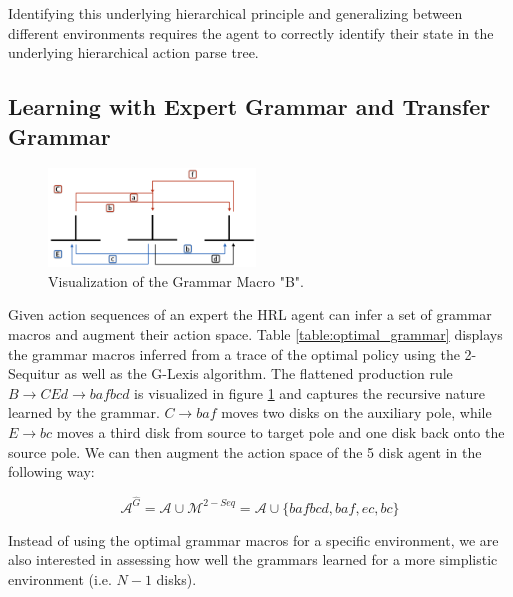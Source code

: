 \documentclass[colorinlistoftodos]{article}
\theoremstyle{definition}
\begin{document}
Identifying this underlying hierarchical principle and generalizing between different environments requires the agent to correctly identify their state in the underlying hierarchical action parse tree.
\subsection{Learning with Expert Grammar and Transfer Grammar}


\begin{figure}
  \begin{center}
    \includegraphics[width=0.49\textwidth]{figures/grammar_macro_viz}
  \end{center}
  \caption{Visualization of the Grammar Macro "B".}
  \label{fig:grammar_macro}
\end{figure}

Given action sequences of an expert the HRL agent can infer a set of grammar macros and augment their action space. Table \ref{table:optimal_grammar} displays the grammar macros inferred from a trace of the optimal policy using the 2-Sequitur as well as the G-Lexis algorithm. The flattened production rule $B \to CEd \to bafbcd$ is visualized in figure \ref{fig:grammar_macro} and captures the recursive nature learned by the grammar. $C \to baf$ moves two disks on the auxiliary pole, while $E \to bc$ moves a third disk from source to target pole and one disk back onto the source pole. We can then augment the action space of the 5 disk agent in the following way:

$$\mathcal{A}^{\hat{G}} = \mathcal{A} \cup \mathcal{M}^{2-Seq} = \mathcal{A} \cup \{bafbcd, baf, ec, bc\}$$


Instead of using the optimal grammar macros for a specific environment, we are also interested in assessing how well the grammars learned for a more simplistic environment (i.e. $N-1$ disks).  

\end{document}
